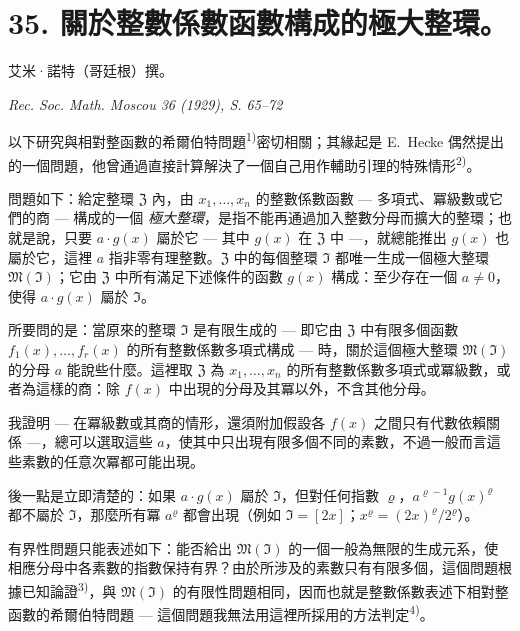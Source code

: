 \documentclass[11pt]{article}
\begin{document}
\setcounter{footnote}{0}

\section*{35. 關於整數係數函數構成的極大整環。}

\begin{center}
艾米·諾特（哥廷根）撰。\par
\emph{Rec. Soc. Math. Moscou 36 (1929), S. 65--72}
\end{center}




以下研究與相對整函數的希爾伯特問題\textsuperscript{1)}密切相關；其緣起是 E.\ Hecke 偶然提出的一個問題，他曾通過直接計算解決了一個自己用作輔助引理的特殊情形\textsuperscript{2)}。

問題如下：給定整環 $\mathfrak{Z}$ 內，由 $x_1,\ldots,x_n$ 的整數係數函數 --- 多項式、冪級數或它們的商 --- 構成的一個 \textit{極大整環}，是指不能再通過加入整數分母而擴大的整環；也就是說，只要 $a \cdot g(x)$ 屬於它 --- 其中 $g(x)$ 在 $\mathfrak{Z}$ 中 ---，就總能推出 $g(x)$ 也屬於它，這裡 $a$ 指非零有理整數。$\mathfrak{Z}$ 中的每個整環 $\mathfrak{I}$ 都唯一生成一個極大整環 $\mathfrak{M}(\mathfrak{I})$；它由 $\mathfrak{Z}$ 中所有滿足下述條件的函數 $g(x)$ 構成：至少存在一個 $a \neq 0$，使得 $a \cdot g(x)$ 屬於 $\mathfrak{I}$。

所要問的是：當原來的整環 $\mathfrak{I}$ 是有限生成的 --- 即它由 $\mathfrak{Z}$ 中有限多個函數 $f_1(x),\ldots,f_r(x)$ 的所有整數係數多項式構成 --- 時，關於這個極大整環 $\mathfrak{M}(\mathfrak{I})$ 的分母 $a$ 能說些什麼。這裡取 $\mathfrak{Z}$ 為 $x_1,\ldots,x_n$ 的所有整數係數多項式或冪級數，或者為這樣的商：除 $f(x)$ 中出現的分母及其冪以外，不含其他分母。

我證明 --- 在冪級數或其商的情形，還須附加假設各 $f(x)$ 之間只有代數依賴關係 ---，總可以選取這些 $a$，使其中只出現有限多個不同的素數，不過一般而言這些素數的任意次冪都可能出現。

後一點是立即清楚的：如果 $a\cdot g(x)$ 屬於 $\mathfrak{I}$，但對任何指數 $\varrho$，$a^{\varrho-1}g(x)^{\varrho}$ 都不屬於 $\mathfrak{I}$，那麼所有冪 $a^{\varrho}$ 都會出現（例如 $\mathfrak{I}=[2x]$；$x^{\varrho}=(2x)^{\varrho}/2^{\varrho}$）。

有界性問題只能表述如下：能否給出 $\mathfrak{M}(\mathfrak{I})$ 的一個一般為無限的生成元系，使相應分母中各素數的指數保持有界？由於所涉及的素數只有有限多個，這個問題根據已知論證\textsuperscript{3)}，與 $\mathfrak{M}(\mathfrak{I})$ 的有限性問題相同，因而也就是整數係數表述下相對整函數的希爾伯特問題 --- 這個問題我無法用這裡所採用的方法判定\textsuperscript{4)}。
\end{document}
